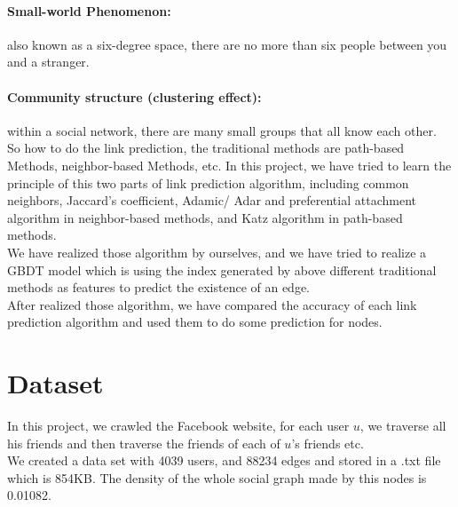 \documentclass{article}
\begin{document}
\paragraph{Small-world Phenomenon:}also known as a six-degree space, there are no more than six people between you and a stranger.\\

\paragraph{Community structure (clustering effect):} within a social network, there are many small groups that all know each other.\\

So how to do the link prediction, the traditional methods are path-based Methods, neighbor-based Methods, etc. In this project, we have tried to learn the principle of this two parts of link prediction algorithm, including common neighbors, Jaccard’s coefficient, Adamic/ Adar and preferential attachment algorithm in neighbor-based methods, and Katz algorithm in path-based methods.\\ 


We have realized those algorithm by ourselves, and we have tried to realize a GBDT model which is using the index generated by above different traditional methods as features to predict the existence of an edge.
\\

After realized those algorithm, we have compared the accuracy of each link prediction algorithm and used them to do some prediction for nodes.
\\

\section{Dataset}
In this project, we crawled the Facebook website, for each user $u$, we traverse all his friends and then traverse the friends of each of $u$’s friends etc.\\

We created a data set with 4039 users, and 88234 edges and stored in a .txt file which is 854KB. The density of the whole social graph made by this nodes is 0.01082. 
\\
\end{document}
